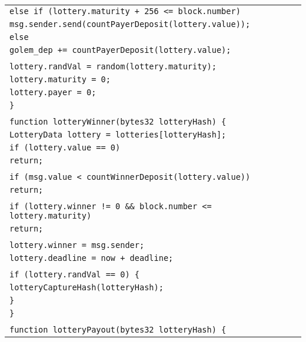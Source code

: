 \documentclass[a4paper]{article}
\begin{document}
\begin{tabularx}{\linewidth}{l}
        \qquad\qquad\texttt{else if~(lottery.maturity + 256 <= block.number)}\\
        \qquad\qquad\qquad\texttt{msg.sender.send(countPayerDeposit(lottery.value));}\\
        \qquad\qquad\texttt{else}\\
        \qquad\qquad\qquad\texttt{golem\_dep += countPayerDeposit(lottery.value);}\\
        \\
        \qquad\qquad\texttt{lottery.randVal = random(lottery.maturity);}\\
        \qquad\qquad\texttt{lottery.maturity = 0;}\\
        \qquad\qquad\texttt{lottery.payer = 0;}\\
        \qquad\texttt{\}}\\
        \\
        \qquad\texttt{function lotteryWinner(bytes32 lotteryHash) \{}\\
        \qquad\qquad\texttt{LotteryData lottery = lotteries[lotteryHash];}\\
        \qquad\qquad\texttt{if (lottery.value == 0)}\\
        \qquad\qquad\qquad\texttt{return;}\\
        \\
        \qquad\qquad\texttt{if (msg.value < countWinnerDeposit(lottery.value))}\\
        \qquad\qquad\qquad\texttt{return;}\\
        \\
        \qquad\qquad\texttt{if (lottery.winner != 0 \&\& block.number <= lottery.maturity)}\\
        \qquad\qquad\qquad\texttt{return;}\\
        \\
        \qquad\qquad\texttt{lottery.winner = msg.sender;}\\
        \qquad\qquad\texttt{lottery.deadline = now + deadline;}\\
        \\
        \qquad\qquad\texttt{if (lottery.randVal == 0) \{}\\
        \qquad\qquad\qquad\texttt{lotteryCaptureHash(lotteryHash);}\\
        \qquad\qquad\texttt{\}}\\
        \qquad\texttt{\}}\\
        \\
        \qquad\texttt{function lotteryPayout(bytes32 lotteryHash) \{}\\

\end{tabularx}
\end{document}
